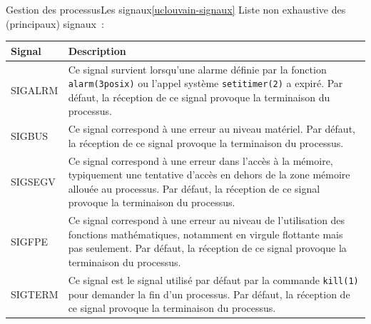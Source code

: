 \documentclass{beamer}
\begin{document}
    \begin{frame}{Gestion des processus}{Les signaux\cref{uclouvain-signaux}}
        Liste non exhaustive des (principaux) signaux~:
        \begin{tiny}
            \begin{table}[h!]
                \centering
                \begin{tabular}{|p{2cm}|p{9cm}|}
                    \hline
                    \textbf{Signal}    & \textbf{Description}                                                                                                                                                                                                                                                               \\
                    \hline
                    SIGALRM            & Ce signal survient lorsqu'une alarme définie par la fonction \lstinline{alarm(3posix)} ou l'appel système \lstinline{setitimer(2)} a expiré. Par défaut, la réception de ce signal provoque la terminaison du processus.                                                           \\
                    \hline
                    SIGBUS             & Ce signal correspond à une erreur au niveau matériel. Par défaut, la réception de ce signal provoque la terminaison du processus.                                                                                                                                                  \\
                    \hline
                    SIGSEGV            & Ce signal correspond à une erreur dans l'accès à la mémoire, typiquement une tentative d'accès en dehors de la zone mémoire allouée au processus. Par défaut, la réception de ce signal provoque la terminaison du processus.                                                      \\
                    \hline
                    SIGFPE             & Ce signal correspond à une erreur au niveau de l'utilisation des fonctions mathématiques, notamment en virgule flottante mais pas seulement. Par défaut, la réception de ce signal provoque la terminaison du processus.                                                           \\
                    \hline
                    SIGTERM            & Ce signal est le signal utilisé par défaut par la commande \lstinline{kill(1)} pour demander la fin d'un processus. Par défaut, la réception de ce signal provoque la terminaison du processus.                                                                                    \\

\end{tabular}
\end{table}
\end{tiny}
\end{frame}
\end{document}
